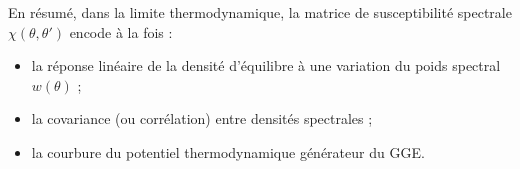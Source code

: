 \noindent
En résumé, dans la limite thermodynamique, la matrice de susceptibilité spectrale $\chi(\theta, \theta')$ encode à la fois :

\begin{itemize}[label = $\bullet$] 
  \item la réponse linéaire de la densité d'équilibre à une variation du poids spectral $w(\theta)$ ;
  \item la covariance (ou corrélation) entre densités spectrales ;
  \item la courbure du potentiel thermodynamique générateur du GGE.
\end{itemize}





%

